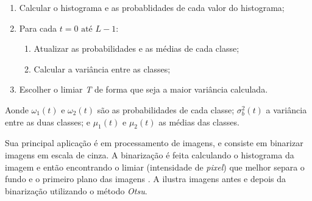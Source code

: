 \begin{enumerate}
    \item Calcular o histograma e as probablidades de cada valor do histograma;
    \item 
        Para cada $t = 0 \text{ até } L-1$:
        \begin{enumerate}
            \item Atualizar as probabilidades e as médias de cada classe;
            \item Calcular a variância entre as classes;
        \end{enumerate}
    \item Escolher o limiar \textit{T} de forma que seja a maior variância calculada.
\end{enumerate}






\par Aonde $\omega_{1}(t)$ e $\omega_{2}(t)$ são as probabilidades de cada classe; $\sigma_{b}^{2}(t)$ a variância entre as duas classes; e $\mu_{1}(t)$ e $\mu_{2}(t)$ as médias das classes.

\par Sua principal aplicação é em processamento de imagens, e consiste em binarizar imagens em escala de cinza. A binarização é feita calculando o histograma da imagem e então encontrando o limiar (intensidade de \textit{pixel}) que melhor separa o fundo e o primeiro plano das imagens \cite{gonsalez2006}. A  ilustra imagens antes e depois da binarização utilizando o método \textit{Otsu}.



